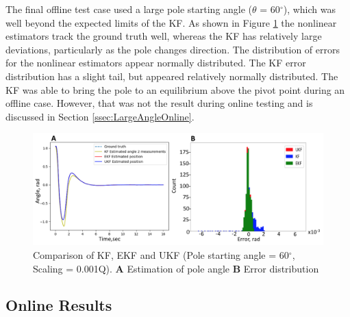 \documentclass{article}
\begin{document}
 The final offline test case used a large pole starting angle ($\theta$ = 60$^{\circ}$), which was well beyond the expected limits of the KF.  As shown in Figure \ref{fig:offline60deg} the nonlinear estimators track the ground truth well, whereas the KF has relatively large deviations, particularly as the pole changes direction.  The distribution of errors for the nonlinear estimators appear normally distributed.  The KF error distribution has a slight tail, but appeared relatively normally distributed.  The KF was able to bring the pole to an equilibrium above the pivot point during an offline case.  However, that was not the result during online testing and is discussed in Section \ref{ssec:LargeAngleOnline}.
  \begin{figure}[h!]
 	\centering
 	\includegraphics[width=15cm,keepaspectratio]{offline60deg.png}
 	\caption{Comparison of KF, EKF and UKF (Pole starting angle = 60$^{\circ}$, Scaling = 0.001Q). \textbf{A} Estimation of pole angle \textbf{B} Error distribution}
 	\label{fig:offline60deg}
 \end{figure}

\subsection{Online Results}
\end{document}
